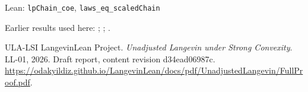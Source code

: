 \documentclass[11pt,a4paper]{article}
\begin{document}
\begin{leanbox}{Lean: \texttt{lpChain\_\allowbreak{}coe}, \texttt{laws\_\allowbreak{}eq\_\allowbreak{}scaledChain}}
\begin{enumerate}
\end{enumerate}
\end{leanbox}


Earlier results used here: \cite[Section~3.13.12]{LangevinLean2026ULASC}; \cite[Section~3.19.1]{LangevinLean2026ULASC}; \cite[Section~3.19.2]{LangevinLean2026ULASC}.

\begin{thebibliography}{ULA-LSI}
LangevinLean Project. \emph{Unadjusted Langevin under Strong Convexity}. LL-01, 2026. Draft report, content revision d34ead06987c. \url{https://odakyildiz.github.io/LangevinLean/docs/pdf/UnadjustedLangevin/FullProof.pdf}.
\end{thebibliography}
\end{document}
